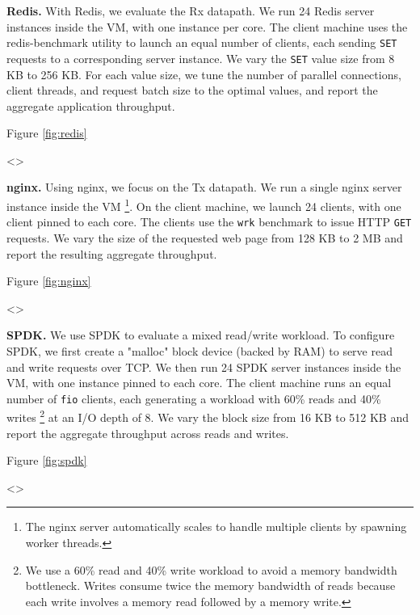 \textbf{Redis.} With Redis, we evaluate the Rx datapath. We run 24 Redis server instances inside the VM, with one instance per core. The client machine uses the redis-benchmark utility to launch an equal number of clients, each sending \texttt{SET} requests to a corresponding server instance. We vary the \texttt{SET} value size from 8 KB to 256 KB. For each value size, we tune the number of parallel connections, client threads, and request batch size to the optimal values, and report the aggregate application throughput.

Figure \ref{fig:redis}

<>

\textbf{nginx.} Using nginx, we focus on the Tx datapath. We run a single nginx server instance inside the VM \footnote{The nginx server automatically scales to handle multiple clients by spawning worker threads.}. On the client machine, we launch 24 clients, with one client pinned to each core. The clients use the \texttt{wrk} benchmark \cite{wrk} to issue HTTP \texttt{GET} requests. We vary the size of the requested web page from 128 KB to 2 MB and report the resulting aggregate throughput.

Figure \ref{fig:nginx}

<>

\textbf{SPDK.} We use SPDK to evaluate a mixed read/write workload. To configure SPDK, we first create a "malloc" block device (backed by RAM) to serve read and write requests over TCP. We then run 24 SPDK server instances inside the VM, with one instance pinned to each core. The client machine runs an equal number of \texttt{fio} \cite{fio} clients, each generating a workload with 60\% reads and 40\% writes \footnote{We use a 60\% read and 40\% write workload to avoid a memory bandwidth bottleneck. Writes consume twice the memory bandwidth of reads because each write involves a memory read followed by a memory write.} at an I/O depth of 8. We vary the block size from 16 KB to 512 KB and report the aggregate throughput across reads and writes.

Figure \ref{fig:spdk}

<>

